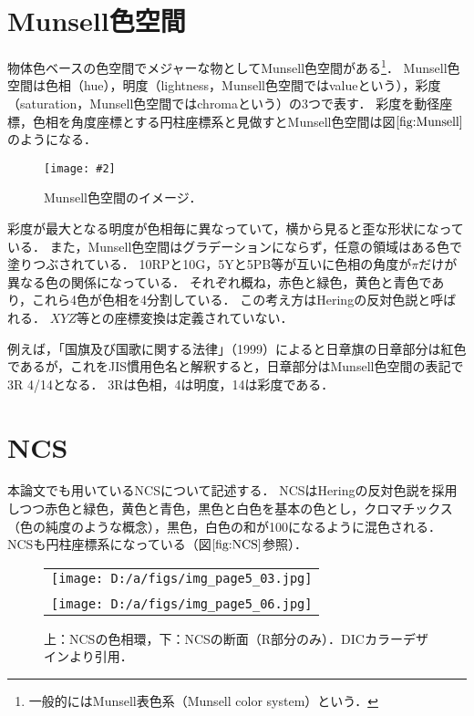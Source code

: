 \documentclass[uplatex,paper=a4,fontsize=4.0truemm,jafontsize=4.0truemm,head_space=30.0truemm,foot_space=30.0truemm,baselineskip=8.0truemm,line_length=40zw,gutter=25.0truemm,oneside,openany,fleqn,hanging_panctuation,open_bracket_pos=nibu_tentsuki,dvipdfmx,jis2004,book,titlepage]{jlreq}
\theoremstyle{mystyle}
\newcommand{\captiondot}[1]{\caption{#1．}}
\newcommand{\figureinput}[4]{\begin{figure}[tbp]\centering\texttt{[image: \#2]}\captiondot{#3}\label{fig:#4}\end{figure}}
\newcommand{\mathdisplaystyle}[1]{\(\displaystyle{#1}\)}
\newcommand{\Reference}[1]{\mathdisplaystyle{\ref{#1}}}
\begin{document}
		\section{Munsell色空間}
			物体色ベースの色空間でメジャーな物としてMunsell色空間がある\footnote{一般的にはMunsell表色系（Munsell color system）という．}．
			Munsell色空間は色相（hue），明度（lightness，Munsell色空間ではvalueという），彩度（saturation，Munsell色空間ではchromaという）の3つで表す．
			彩度を動径座標，色相を角度座標とする円柱座標系と見做すとMunsell色空間は図\Reference{fig:Munsell}のようになる．
			\figureinput{width=5truecm}{D:/a/figs/munsell3.png}{Munsell色空間のイメージ\protect\cite{Fukue2010}}{Munsell}
			彩度が最大となる明度が色相毎に異なっていて，横から見ると歪な形状になっている．
			また，Munsell色空間はグラデーションにならず，任意の領域はある色で塗りつぶされている．
			10RPと10G，5Yと5PB等が互いに色相の角度が\mathdisplaystyle{\pi}だけが異なる色の関係になっている．
			それぞれ概ね，赤色と緑色，黄色と青色であり，これら4色が色相を4分割している．
			この考え方はHeringの反対色説と呼ばれる．
			\mathdisplaystyle{XYZ}等との座標変換は定義されていない．

			例えば，「国旗及び国歌に関する法律」（1999）によると日章旗の日章部分は紅色であるが，これをJIS慣用色名と解釈すると，日章部分はMunsell色空間の表記で3R 4/14となる．
			3Rは色相，4は明度，14は彩度である．
		\section{NCS}
			本論文でも用いているNCSについて記述する．
			NCSはHeringの反対色説を採用しつつ赤色と緑色，黄色と青色，黒色と白色を基本の色とし，クロマチックス（色の純度のような概念），黒色，白色の和が100になるように混色される．
			NCSも円柱座標系になっている（図\Reference{fig:NCS}参照）．
			\begin{figure}[tbp]
				\centering
				\begin{tabular}{c}
					\begin{minipage}{\linewidth}
						\centering
						\texttt{[image: D:/a/figs/img\_page5\_03.jpg]}
					\end{minipage} \\
					\begin{minipage}{0.06\linewidth}
						\vspace{10truemm}
					\end{minipage} \\
					\begin{minipage}{\linewidth}
						\centering
						\texttt{[image: D:/a/figs/img\_page5\_06.jpg]}
					\end{minipage}
				\end{tabular}
				\captiondot{上：NCSの色相環，下：NCSの断面（R部分のみ）．DICカラーデザイン\protect\cite{DIC2015}より引用}\label{fig:NCS}
			\end{figure}
\end{document}
